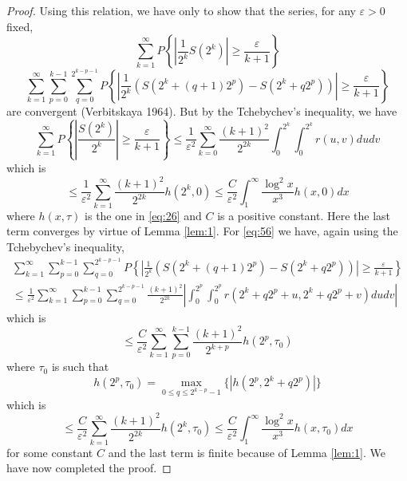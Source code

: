 \documentclass{article}
\begin{document}
\begin{proof}
Using this relation, we have only to show that the series, for any $\varepsilon>0$ fixed,
\begin{equation}\label{eq:55}
\sum_{k=1}^{\infty} P\left\{\left|\frac{1}{2^{k}} S(2^{k})\right| \geq \frac{\varepsilon}{k+1}\right\}
\end{equation}
\begin{equation}\label{eq:56}
\sum_{k=1}^{\infty} \sum_{p=0}^{k-1} \sum_{q=0}^{2^{k-p-1}} P\left\{\left|\frac{1}{2^{k}}(S(2^{k}+(q+1)2^{p})-S(2^{k}+q2^{p}))\right| \geq \frac{\varepsilon}{k+1}\right\}
\end{equation}
are convergent (Verbitskaya 1964). But by the Tchebychev's inequality, we have
\begin{equation}\label{eq:57}
\sum_{k=1}^{\infty} P\left\{\left|\frac{S(2^{k})}{2^{k}}\right| \geq \frac{\varepsilon}{k+1}\right\} \leq \frac{1}{\varepsilon^{2}} \sum_{k=0}^{\infty} \frac{(k+1)^{2}}{2^{2k}} \int_{0}^{2^{k}} \int_{0}^{2^{k}} r(u,v) dudv
\end{equation}
which is
\begin{equation}\label{eq:58}
\leq \frac{1}{\varepsilon^{2}} \sum_{k=1}^{\infty} \frac{(k+1)^{2}}{2^{2k}} h(2^{k}, 0) \leq \frac{C}{\varepsilon^{2}} \int_{1}^{\infty} \frac{\log^{2} x}{x^{3}} h(x, 0) dx
\end{equation}
where $h(x, \tau)$ is the one in \eqref{eq:26} and $C$ is a positive constant. Here the last term converges by virtue of Lemma \ref{lem:1}. For \eqref{eq:56} we have, again using the Tchebychev's inequality,
\begin{equation}\label{eq:59}
\begin{split}
\sum_{k=1}^{\infty} \sum_{p=0}^{k-1} \sum_{q=0}^{2^{k-p-1}} P\left\{\left|\frac{1}{2^{k}}(S(2^{k}+(q+1)2^{p})-S(2^{k}+q2^{p}))\right| \geq \frac{\varepsilon}{k+1}\right\}\\
\leq \frac{1}{\varepsilon^{2}} \sum_{k=1}^{\infty} \sum_{p=0}^{k-1} \sum_{q=0}^{2^{k-p-1}} \frac{(k+1)^{2}}{2^{2k}}\left|\int_{0}^{2^{p}} \int_{0}^{2^{p}} r(2^{k}+q2^{p}+u, 2^{k}+q2^{p}+v) dudv\right|
\end{split}
\end{equation}
which is
\begin{equation}\label{eq:60}
\leq \frac{C}{\varepsilon^{2}} \sum_{k=1}^{\infty} \sum_{p=0}^{k-1} \frac{(k+1)^{2}}{2^{k+p}} h(2^{p}, \tau_{0})
\end{equation}
where $\tau_{0}$ is such that
\begin{equation}\label{eq:61}
h(2^{p}, \tau_{0})=\max_{0 \leq q \leq 2^{k-p}-1}\{|h(2^{p}, 2^{k}+q2^{p})|\}
\end{equation}
which is
\begin{equation}\label{eq:62}
\leq \frac{C}{\varepsilon^{2}} \sum_{k=1}^{\infty} \frac{(k+1)^{2}}{2^{2k}} h(2^{k}, \tau_{0}) \leq \frac{C}{\varepsilon^{2}} \int_{1}^{\infty} \frac{\log^{2} x}{x^{3}} h(x, \tau_{0}) dx
\end{equation}
for some constant $C$ and the last term is finite because of Lemma \ref{lem:1}. We have now completed the proof.
\end{proof}
\end{document}
